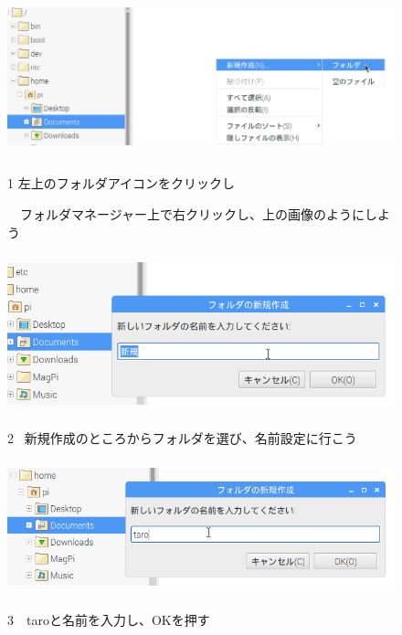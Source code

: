 \documentclass[a4paper,12pt]{jarticle}
\begin{document}
\begin{figure}[ht]
	\vspace{8mm}\\
\centering
\includegraphics[width=13.33cm,height=4.74cm]{textbook-img034.png}
\begin{minipage}{\textwidth}
1
左上のフォルダアイコンをクリックし

　フォルダマネージャー上で右クリックし、上の画像のようにしよう
\end{minipage}

\centering
\includegraphics[width=12.483cm,height=4.584cm]{textbook-img036.png}
\begin{minipage}{\textwidth}
2
\ 新規作成のところからフォルダを選び、名前設定に行こう
\end{minipage}

\centering
\includegraphics[width=12.776cm,height=3.879cm]{textbook-img039.png}
\begin{minipage}{\textwidth}
3　taroと名前を入力し、OKを押す
\end{minipage}


\end{figure}
\end{document}
